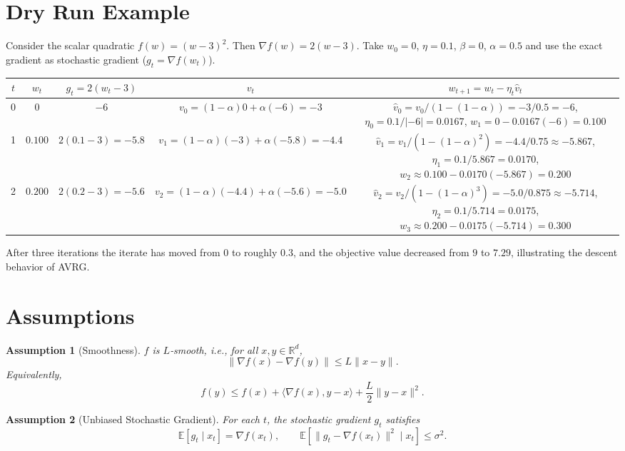 \documentclass{article}
\newtheorem{assumption}{Assumption}
\newcommand{\E}{\mathbb{E}}
\begin{document}
\section*{Dry Run Example}
Consider the scalar quadratic $f(w)=(w-3)^2$.
Then $\nabla f(w)=2(w-3)$.  
Take $w_0=0$, $\eta=0.1$, $\beta=0$, $\alpha=0.5$ and use the exact gradient
as stochastic gradient ($g_t=\nabla f(w_t)$).

\begin{center}
\begin{tabular}{c|c|c|c|c}
$t$ & $w_t$ & $g_t=2(w_t-3)$ & $v_t$ & $w_{t+1}=w_t-\eta_t\hat v_t$\\\hline
0 & $0$ & $-6$ & $v_0=(1-\alpha)0+\alpha(-6)=-3$ &
$\hat v_0=v_0/(1-(1-\alpha))=-3/0.5=-6$, $\eta_0=0.1/|{-6}|=0.0167$, $w_1=0-0.0167(-6)=0.100$\\\hline
1 & $0.100$ & $2(0.1-3)=-5.8$ &
$v_1=(1-\alpha)(-3)+\alpha(-5.8)=-4.4$ &
$\hat v_1=v_1/(1-(1-\alpha)^2)=-4.4/0.75\approx-5.867$, $\eta_1=0.1/5.867=0.0170$, $w_2\approx0.100-0.0170(-5.867)=0.200$\\\hline
2 & $0.200$ & $2(0.2-3)=-5.6$ &
$v_2=(1-\alpha)(-4.4)+\alpha(-5.6)=-5.0$ &
$\hat v_2=v_2/(1-(1-\alpha)^3)=-5.0/0.875\approx-5.714$, $\eta_2=0.1/5.714=0.0175$, $w_3\approx0.200-0.0175(-5.714)=0.300$\\\hline
\end{tabular}
\end{center}
After three iterations the iterate has moved from $0$ to roughly $0.3$, and the
objective value decreased from $9$ to $7.29$, illustrating the descent
behavior of AVRG.

\newpage
\section*{Assumptions}
\begin{assumption}[Smoothness]\label{as:smooth}
$f$ is $L$‑smooth, i.e., for all $x,y\in\mathbb{R}^d$,
\[
\|\nabla f(x)-\nabla f(y)\|\le L\|x-y\|.
\tag{A1}
\]
Equivalently,
\[
f(y)\le f(x)+\langle\nabla f(x),y-x\rangle+\frac{L}{2}\|y-x\|^{2}.
\tag{A1'}
\]
\end{assumption}

\begin{assumption}[Unbiased Stochastic Gradient]\label{as:unbiased}
For each $t$, the stochastic gradient $g_t$ satisfies
\[
\E[g_t\mid x_t]=\nabla f(x_t),\qquad 
\E\!\left[\|g_t-\nabla f(x_t)\|^{2}\mid x_t\right]\le\sigma^{2}.
\tag{A2}
\]
\end{assumption}
\end{document}
